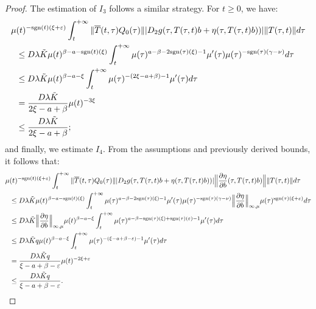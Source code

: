 \documentclass[9pt]{amsart}
\numberwithin{equation}{section}
\numberwithin{lemma}{section}
\begin{document}
\begin{proof}
The estimation of \(I_3\) follows a similar strategy. For \(t \geq 0\), we have:
\begin{equation*}
    \begin{split}
        \mu&(t)^{-\textnormal{sgn}(t)(\xi+\varepsilon)}\int_{t}^{+\infty}\|\overline{T}(t,\tau)Q_0(\tau)\| |D_2g(\tau,T(\tau,t)b+\eta(\tau,T(\tau,t)b))| \|T(\tau,t)\|d\tau\\
        &\leq D\lambda\tilde{K}\mu(t)^{\beta-a-\textnormal{sgn}(t)(\xi)}\int_{t}^{+\infty}\mu(\tau)^{a-\beta-2\textnormal{sgn}(\tau)(\xi)-1}\mu'(\tau)\mu(\tau)^{-\textnormal{sgn}(\tau)(\gamma-\nu)}d\tau\\
        &\leq D\lambda\tilde{K}\mu(t)^{\beta-a-\xi}\int_{t}^{+\infty}\mu(\tau)^{-(2\xi-a+\beta)-1}\mu'(\tau)d\tau\\
        &= \frac{D\lambda\tilde{K}}{2\xi-a+\beta}\mu(t)^{-3\xi}\\
        &\leq \frac{D\lambda\tilde{K}}{2\xi-a+\beta};
    \end{split}
\end{equation*}
and finally, we estimate \(I_4\). From the assumptions and previously derived bounds, it follows that:
\begin{equation*}
    \begin{split}
        \mu&(t)^{-\textnormal{sgn}(t)(\xi+\varepsilon)}\int_{t}^{+\infty}\|\overline{T}(t,\tau)Q_0(\tau)\| |D_2g(\tau,T(\tau,t)b+\eta(\tau,T(\tau,t)b))| \Big\|\frac{\partial\eta}{\partial b}(\tau,T(\tau,t)b)\Big\| \|T(\tau,t)\|d\tau\\
        &\leq D\lambda\tilde{K}\mu(t)^{\beta-a-\textnormal{sgn}(t)(\xi)}\int_{t}^{+\infty}\mu(\tau)^{a-\beta-2\textnormal{sgn}(\tau)(\xi)-1}\mu'(\tau)\mu(\tau)^{-\textnormal{sgn}(\tau)(\gamma-\nu)}\Big\|\frac{\partial\eta}{\partial b}\Big\|_{\infty,\mu}\mu(\tau)^{\textnormal{sgn}(\tau)(\xi+\varepsilon)}d\tau\\
        &\leq D\lambda\tilde{K}\Big\|\frac{\partial\eta}{\partial b}\Big\|_{\infty,\mu}\mu(t)^{\beta-a-\xi}\int_{t}^{+\infty}\mu(\tau)^{a-\beta-\textnormal{sgn}(\tau)(\xi)+\textnormal{sgn}(\tau)(\varepsilon)-1}\mu'(\tau)d\tau\\
        &\leq D\lambda\tilde{K} q\mu(t)^{\beta-a-\xi}\int_{t}^{+\infty}\mu(\tau)^{-(\xi-a+\beta-\varepsilon)-1}\mu'(\tau)d\tau\\
        &= \frac{D\lambda\tilde{K}q}{\xi-a+\beta-\varepsilon}\mu(t)^{-2\xi+\varepsilon}\\
        &\leq \frac{D\lambda\tilde{K}q}{\xi-a+\beta-\varepsilon}.
    \end{split}
\end{equation*}


\end{proof}
\end{document}
